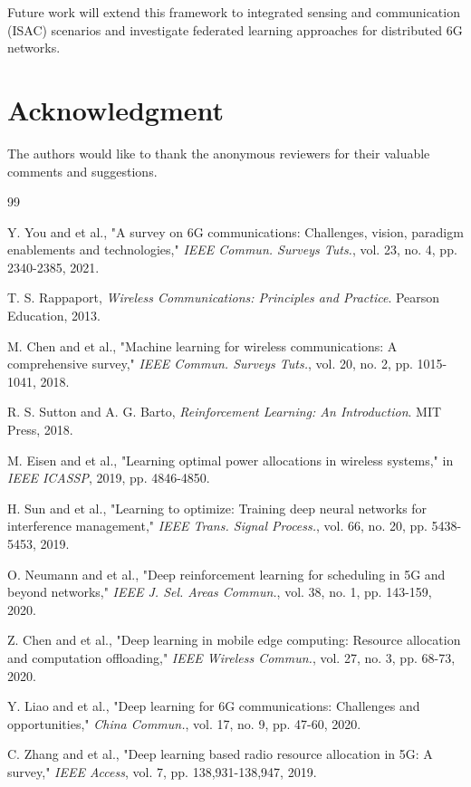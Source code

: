 \documentclass[journal]{IEEEtran}
\begin{document}
Future work will extend this framework to integrated sensing and communication (ISAC) scenarios and investigate federated learning approaches for distributed 6G networks.

\section*{Acknowledgment}
The authors would like to thank the anonymous reviewers for their valuable comments and suggestions.

\begin{thebibliography}{99}
\providecommand{\natexlab}[1]{#1}
\providecommand{\url}[1]{#1}
\providecommand{\urlpref}[1]{\textsuperscript{#1}}

 Y. You and et al., "A survey on 6G communications: Challenges, vision, paradigm enablements and technologies," \emph{IEEE Commun. Surveys Tuts.}, vol. 23, no. 4, pp. 2340-2385, 2021.

 T. S. Rappaport, \emph{Wireless Communications: Principles and Practice}. Pearson Education, 2013.

 M. Chen and et al., "Machine learning for wireless communications: A comprehensive survey," \emph{IEEE Commun. Surveys Tuts.}, vol. 20, no. 2, pp. 1015-1041, 2018.

 R. S. Sutton and A. G. Barto, \emph{Reinforcement Learning: An Introduction}. MIT Press, 2018.

 M. Eisen and et al., "Learning optimal power allocations in wireless systems," in \emph{IEEE ICASSP}, 2019, pp. 4846-4850.

 H. Sun and et al., "Learning to optimize: Training deep neural networks for interference management," \emph{IEEE Trans. Signal Process.}, vol. 66, no. 20, pp. 5438-5453, 2019.

 O. Neumann and et al., "Deep reinforcement learning for scheduling in 5G and beyond networks," \emph{IEEE J. Sel. Areas Commun.}, vol. 38, no. 1, pp. 143-159, 2020.

 Z. Chen and et al., "Deep learning in mobile edge computing: Resource allocation and computation offloading," \emph{IEEE Wireless Commun.}, vol. 27, no. 3, pp. 68-73, 2020.

 Y. Liao and et al., "Deep learning for 6G communications: Challenges and opportunities," \emph{China Commun.}, vol. 17, no. 9, pp. 47-60, 2020.

 C. Zhang and et al., "Deep learning based radio resource allocation in 5G: A survey," \emph{IEEE Access}, vol. 7, pp. 138,931-138,947, 2019.
\end{thebibliography}
\end{document}
